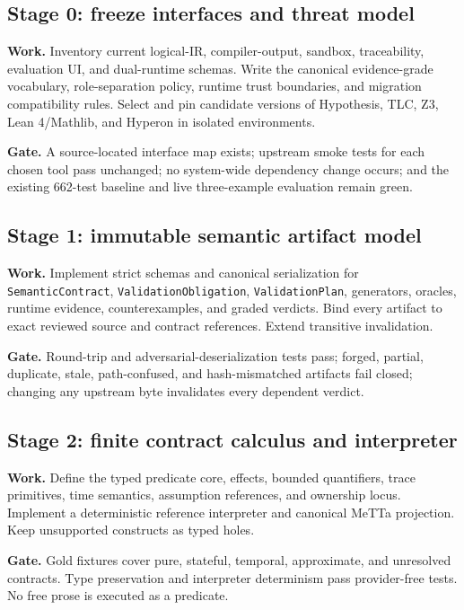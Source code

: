\documentclass[10pt]{article}
\begin{document}
\subsection*{Stage 0: freeze interfaces and threat model}

\textbf{Work.} Inventory current logical-IR, compiler-output, sandbox,
traceability, evaluation UI, and dual-runtime schemas.  Write the canonical
evidence-grade vocabulary, role-separation policy, runtime trust boundaries,
and migration compatibility rules.  Select and pin candidate versions of
Hypothesis, TLC, Z3, Lean 4/Mathlib, and Hyperon in isolated environments.

\textbf{Gate.} A source-located interface map exists; upstream smoke tests for
each chosen tool pass unchanged; no system-wide dependency change occurs; and
the existing 662-test baseline and live three-example evaluation remain green.

\subsection*{Stage 1: immutable semantic artifact model}

\textbf{Work.} Implement strict schemas and canonical serialization for
\texttt{SemanticContract}, \texttt{ValidationObligation},
\texttt{ValidationPlan}, generators, oracles, runtime evidence,
counterexamples, and graded verdicts.  Bind every artifact to exact reviewed
source and contract references.  Extend transitive invalidation.

\textbf{Gate.} Round-trip and adversarial-deserialization tests pass; forged,
partial, duplicate, stale, path-confused, and hash-mismatched artifacts fail
closed; changing any upstream byte invalidates every dependent verdict.

\subsection*{Stage 2: finite contract calculus and interpreter}

\textbf{Work.} Define the typed predicate core, effects, bounded quantifiers,
trace primitives, time semantics, assumption references, and ownership locus.
Implement a deterministic reference interpreter and canonical MeTTa projection.
Keep unsupported constructs as typed holes.

\textbf{Gate.} Gold fixtures cover pure, stateful, temporal, approximate, and
unresolved contracts.  Type preservation and interpreter determinism pass
provider-free tests.  No free prose is executed as a predicate.
\end{document}
